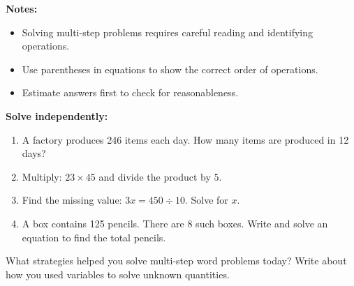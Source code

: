 \documentclass[12pt]{article}
\begin{document}
\vspace{1em}

\begin{tcolorbox}[colframe=black!40, colback=gray!5, 
coltitle=black, colbacktitle=black!20, fonttitle=\bfseries\Large, 
title=Additional Notes, halign title=center, left=5pt, right=5pt, top=5pt, bottom=15pt]
\textbf{Notes:}
\begin{itemize}
    \item Solving multi-step problems requires careful reading and identifying operations.
    \item Use parentheses in equations to show the correct order of operations.
    \item Estimate answers first to check for reasonableness.
\end{itemize}
\end{tcolorbox}

\vspace{1em}

\begin{tcolorbox}[colframe=black!60, colback=white, 
coltitle=black, colbacktitle=black!15, fonttitle=\bfseries\Large, 
title=Independent Practice, halign title=center, left=10pt, right=10pt, top=10pt, bottom=15pt]
\textbf{Solve independently:}
\begin{enumerate}[itemsep=4em]
    \item A factory produces 246 items each day. How many items are produced in 12 days?
    \item Multiply: \( 23 \times 45 \) and divide the product by \( 5 \).
    \item Find the missing value: \( 3x = 450 \div 10 \). Solve for \( x \).
    \item A box contains 125 pencils. There are 8 such boxes. Write and solve an equation to find the total pencils.
\end{enumerate}
\end{tcolorbox}

\vspace{1em}

\begin{tcolorbox}[colframe=black!60, colback=white, 
coltitle=black, colbacktitle=black!15, fonttitle=\bfseries\Large, 
title=Reflection, halign title=center, left=10pt, right=10pt, top=10pt, bottom=90pt]
What strategies helped you solve multi-step word problems today? Write about how you used variables to solve unknown quantities.
\end{tcolorbox}
\end{document}
